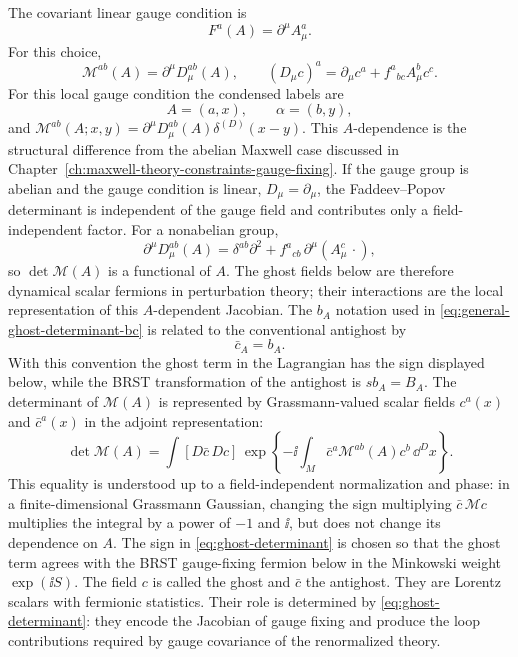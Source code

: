 The covariant linear gauge condition is
\[
  F^a(A)=\partial^\mu A_\mu^a .
\]
For this choice,
\begin{equation}
  \mathcal M^{ab}(A)
  =
  \partial^\mu D_\mu^{ab}(A),
  \qquad
  (D_\mu c)^a
  =
  \partial_\mu c^a+f^a{}_{bc}A_\mu^b c^c .
  \label{eq:covariant-fp-operator}
\end{equation}
For this local gauge condition the condensed labels are
\[
  A=(a,x),\qquad \alpha=(b,y),
\]
and \(\mathcal M^{ab}(A;x,y)=\partial^\mu D_\mu^{ab}(A)\delta^{(D)}(x-y)\).
This \(A\)-dependence is the structural difference from the abelian Maxwell
case discussed in Chapter~\ref{ch:maxwell-theory-constraints-gauge-fixing}.  If
the gauge group is abelian and the gauge condition is linear,
\(D_\mu=\partial_\mu\), the Faddeev--Popov determinant is independent of the
gauge field and contributes only a field-independent factor.  For a
nonabelian group,
\[
  \partial^\mu D_\mu^{ab}(A)
  =
  \delta^{ab}\partial^2
  +
  f^a{}_{cb}\,\partial^\mu(A_\mu^c\,\cdot),
\]
so \(\det\mathcal M(A)\) is a functional of \(A\).  The ghost fields below are
therefore dynamical scalar fermions in perturbation theory; their interactions
are the local representation of this \(A\)-dependent Jacobian.
The \(b_A\) notation used in
\eqref{eq:general-ghost-determinant-bc} is related to the conventional
antighost by
\[
  \bar c_A=b_A .
\]
With this convention the ghost term in the Lagrangian has the sign displayed
below, while the BRST transformation of the antighost is \(s b_A=B_A\).
The determinant of \(\mathcal M(A)\) is represented by Grassmann-valued scalar
fields \(c^a(x)\) and \(\bar c^a(x)\) in the adjoint representation:
\begin{equation}
  \det\mathcal M(A)
  =
  \int [D\bar c\,Dc]\,
  \exp\left\{-\ii\int_M \bar c^a\mathcal M^{ab}(A)c^b\,\dd^D x\right\}.
  \label{eq:ghost-determinant}
\end{equation}
This equality is understood up to a field-independent normalization and phase:
in a finite-dimensional Grassmann Gaussian, changing the sign multiplying
\(\bar c\,\mathcal M c\) multiplies the integral by a power of \(-1\) and
\(\ii\), but does not change its dependence on \(A\).  The sign in
\eqref{eq:ghost-determinant} is chosen so that the ghost term agrees with the
BRST gauge-fixing fermion below in the Minkowski weight \(\exp(\ii S)\).
The field \(c\) is called the ghost and \(\bar c\) the antighost.  They are
Lorentz scalars with fermionic statistics.  Their role is determined by
\eqref{eq:ghost-determinant}: they encode the Jacobian of gauge fixing and
produce the loop contributions required by gauge covariance of the
renormalized theory.

